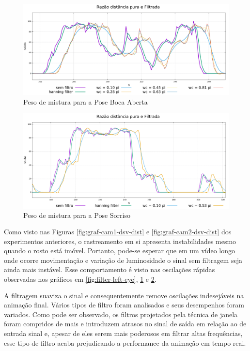 \begin{figure}[!htb]
\centering
\includegraphics[width=1.0\textwidth]{figs/filter-result-left-eye.pdf} 
\caption{Peso de mistura para a Pose Boca Aberta}
\label{fig:filter-open-mouth}
\end{figure}

\begin{figure}[!htb]
\centering
\includegraphics[width=1.0\textwidth]{figs/filter-result-smile.pdf} 
\caption{Peso de mistura para a Pose Sorriso}
\label{fig:filter-smile}
\end{figure}

Como visto nas Figuras \ref{fig:graf-cam1-dsv-dist} e
\ref{fig:graf-cam2-dsv-dist} dos experimentos anteriores, o rastreamento em si
apresenta instabilidades mesmo quando o rosto está imóvel. Portanto, pode-se
esperar que em um vídeo longo onde ocorre movimentação e variação de
luminosidade o sinal sem filtragem seja ainda mais instável. Esse comportamento
é visto nas oscilações rápidas observadas nos gráficos em
\ref{fig:filter-left-eye}, \ref{fig:filter-open-mouth} e \ref{fig:filter-smile}. 

A filtragem suaviza o sinal e consequentemente remove oscilações indesejáveis na
animação final. Vários tipos de filtro foram analisados e seus desempenhos foram
variados. Como pode ser observado, os filtros projetados pela técnica de janela
foram compridos de mais e introduzem atrasos no sinal de saída em relação ao de
entrada sinal e, apesar de eles serem mais poderosos em filtrar altas
frequências, esse tipo de filtro acaba prejudicando a performance da animação em
tempo real. 

